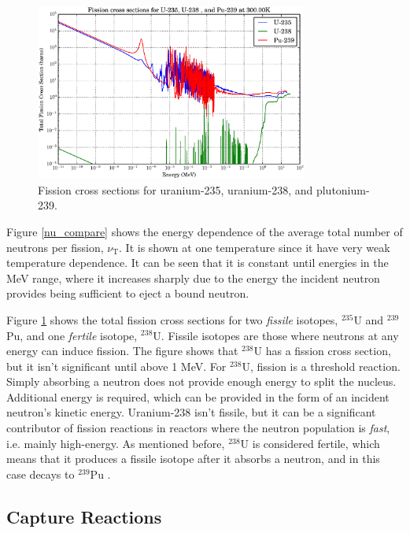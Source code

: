 \begin{figure}[h!]
  \centering
    \includegraphics[width=0.8\textwidth]{graphics/xs_fissile.eps}
     \caption{Fission cross sections for uranium-235, uranium-238, and plutonium-239. \label{xs_fission_only}}
\end{figure}

Figure \ref{nu_compare} shows the energy dependence of the average total number of neutrons per fission, $\nu_\mathrm{T}$. It is shown at one temperature since it have very weak temperature dependence.   It can be seen that it is constant until energies in the MeV range, where it increases sharply due to the energy the incident neutron provides being sufficient to eject a bound neutron.  

Figure \ref{xs_fission_only} shows the total fission cross sections for two \emph{fissile} isotopes,  $^{235}$U and  $^{239}$Pu, and one \emph{fertile} isotope,  $^{238}$U.  Fissile isotopes are those where neutrons at any energy can induce fission.  The figure shows that  $^{238}$U has a fission cross section, but it isn't significant until above 1 MeV.  For  $^{238}$U, fission is a threshold reaction.  Simply absorbing a neutron does not provide enough energy to split the nucleus.  Additional energy is required, which can be provided in the form of an incident neutron's kinetic energy.  Uranium-238 isn't fissile, but it can be a significant contributor of fission reactions in reactors where the neutron population is \emph{fast}, i.e. mainly high-energy.  As mentioned before,  $^{238}$U is considered fertile, which means that it produces a fissile isotope after it absorbs a neutron, and in this case decays to  $^{239}$Pu \cite{duderstadt}.  

\subsection{Capture Reactions}

